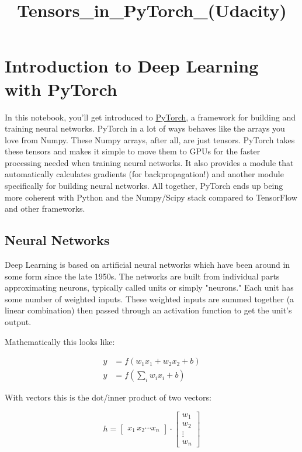 \documentclass[11pt]{article}
\title{Tensors\_in\_PyTorch\_(Udacity)}
\begin{document}
    
    
    \maketitle
    
    

    
    

    \section{Introduction to Deep Learning with
PyTorch}\label{introduction-to-deep-learning-with-pytorch}

In this notebook, you'll get introduced to
\href{http://pytorch.org/}{PyTorch}, a framework for building and
training neural networks. PyTorch in a lot of ways behaves like the
arrays you love from Numpy. These Numpy arrays, after all, are just
tensors. PyTorch takes these tensors and makes it simple to move them to
GPUs for the faster processing needed when training neural networks. It
also provides a module that automatically calculates gradients (for
backpropagation!) and another module specifically for building neural
networks. All together, PyTorch ends up being more coherent with Python
and the Numpy/Scipy stack compared to TensorFlow and other frameworks.

    \subsection{Neural Networks}\label{neural-networks}

Deep Learning is based on artificial neural networks which have been
around in some form since the late 1950s. The networks are built from
individual parts approximating neurons, typically called units or simply
"neurons." Each unit has some number of weighted inputs. These weighted
inputs are summed together (a linear combination) then passed through an
activation function to get the unit's output.

Mathematically this looks like:

\[
\begin{align}
y &= f(w_1 x_1 + w_2 x_2 + b) \\
y &= f\left(\sum_i w_i x_i +b \right)
\end{align}
\]

With vectors this is the dot/inner product of two vectors:

\[
h = \begin{bmatrix}
x_1 \, x_2 \cdots  x_n
\end{bmatrix}
\cdot 
\begin{bmatrix}
           w_1 \\
           w_2 \\
           \vdots \\
           w_n
\end{bmatrix}
\]
\end{document}

